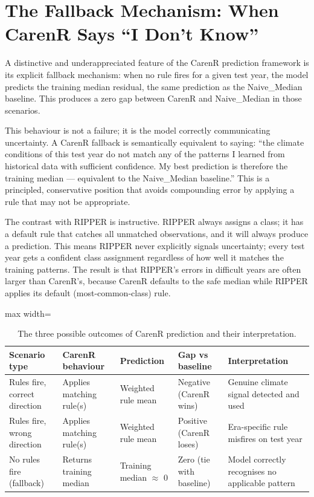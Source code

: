 \section{The Fallback Mechanism: When CarenR Says ``I Don't Know''}\label{sec:the_fallback_mechanism_when}

A distinctive and underappreciated feature of the CarenR prediction framework is its explicit fallback mechanism: when no rule fires for a given test year, the model predicts the training median residual, the same prediction as the Naive\_Median baseline. This produces a zero gap between CarenR and Naive\_Median in those scenarios.

This behaviour is not a failure; it is the model correctly communicating uncertainty. A CarenR fallback is semantically equivalent to saying: ``the climate conditions of this test year do not match any of the patterns I learned from historical data with sufficient confidence. My best prediction is therefore the training median --- equivalent to the Naive\_Median baseline.'' This is a principled, conservative position that avoids compounding error by applying a rule that may not be appropriate.

The contrast with RIPPER is instructive. RIPPER always assigns a class; it has a default rule that catches all unmatched observations, and it will always produce a prediction. This means RIPPER never explicitly signals uncertainty; every test year gets a confident class assignment regardless of how well it matches the training patterns. The result is that RIPPER's errors in difficult years are often larger than CarenR's, because CarenR defaults to the safe median while RIPPER applies its default (most-common-class) rule.

\begin{table}[htbp]
  \centering
  \caption{The three possible outcomes of CarenR prediction and their interpretation.}\label{tab:ch5c_2}
  \small
  \begin{adjustbox}{max width=\textwidth}
    \begin{tabularx}{\textwidth}{p{2.4cm}|p{2.8cm}|p{2.2cm}|p{2.0cm}|X}
  \toprule
  Scenario type & CarenR behaviour & Prediction & Gap vs baseline & Interpretation \\
  \midrule
  Rules fire, correct direction & Applies matching rule(s) & Weighted rule mean & Negative (CarenR wins) & Genuine climate signal detected and used \\
  Rules fire, wrong direction & Applies matching rule(s) & Weighted rule mean & Positive (CarenR loses) & Era-specific rule misfires on test year \\
  No rules fire (fallback) & Returns training median & Training median $\approx$ 0 & Zero (tie with baseline) & Model correctly recognises no applicable pattern \\
  \bottomrule
\end{tabularx}
  \end{adjustbox}

\end{table}


